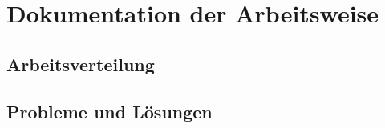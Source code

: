\section{Dokumentation der Arbeitsweise}


\subsection{Arbeitsverteilung}


\subsection{Probleme und Lösungen}

